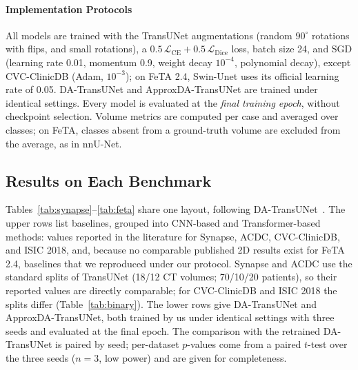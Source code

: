 \paragraph{Implementation Protocols}
All models are trained with the TransUNet augmentations (random $90^\circ$ rotations with flips, and small rotations), a $0.5\,\mathcal{L}_{\text{CE}} + 0.5\,\mathcal{L}_{\text{Dice}}$ loss, batch size 24, and SGD (learning rate 0.01, momentum 0.9, weight decay $10^{-4}$, polynomial decay), except CVC-ClinicDB (Adam, $10^{-3}$); on FeTA 2.4, Swin-Unet uses its official learning rate of 0.05. DA-TransUNet and ApproxDA-TransUNet are trained under identical settings. Every model is evaluated at the \emph{final training epoch}, without checkpoint selection. Volume metrics are computed per case and averaged over classes; on FeTA, classes absent from a ground-truth volume are excluded from the average, as in nnU-Net.

\subsection{Results on Each Benchmark}
\label{sec:main_results}

Tables~\ref{tab:synapse}--\ref{tab:feta} share one layout, following DA-TransUNet~\cite{sun2024datransunet}. The upper rows list baselines, grouped into CNN-based and Transformer-based methods: values reported in the literature for Synapse, ACDC, CVC-ClinicDB, and ISIC 2018, and, because no comparable published 2D results exist for FeTA 2.4, baselines that we reproduced under our protocol. Synapse and ACDC use the standard splits of TransUNet (18/12 CT volumes; 70/10/20 patients), so their reported values are directly comparable; for CVC-ClinicDB and ISIC 2018 the splits differ (Table~\ref{tab:binary}). The lower rows give DA-TransUNet and ApproxDA-TransUNet, both trained by us under identical settings with three seeds and evaluated at the final epoch. The comparison with the retrained DA-TransUNet is paired by seed; per-dataset $p$-values come from a paired $t$-test over the three seeds ($n = 3$, low power) and are given for completeness.

